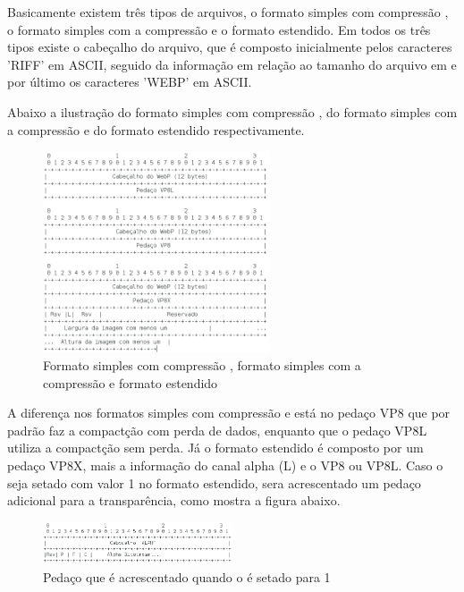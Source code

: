 \documentclass[espaco=simples,appendix=Name]{abnt}
\begin{document}
\begin{description}
Basicamente existem três tipos de arquivos, o formato simples com compressão , o formato simples com a compressão  e o formato estendido. Em todos os três tipos existe o cabeçalho do arquivo, que é composto inicialmente pelos caracteres 'RIFF' em ASCII, seguido da informação em relação ao tamanho do arquivo em  e por último os caracteres 'WEBP' em ASCII.

\newpage

Abaixo a ilustração do formato simples com compressão , do formato simples com a compressão  e do formato estendido respectivamente.

\begin{figure}[h]
  \centering
    \includegraphics[width=0.6\textwidth]{LossyLossLessExtended.png}
  \caption{Formato simples com compressão , formato simples com a compressão  e formato estendido}
\end{figure}

A diferença nos formatos simples com compressão  e  está no pedaço VP8 que por padrão faz a compactção com perda de dados, enquanto que o pedaço VP8L utiliza a compactção sem perda. Já o formato estendido é composto por um pedaço VP8X, mais a informação do canal alpha (L) e o  VP8 ou VP8L. Caso o  seja setado com valor 1 no formato estendido, sera acrescentado um pedaço adicional para a transparência, como mostra a figura abaixo.

\begin{figure}[h]
  \centering
    \includegraphics[width=0.5\textwidth]{AlphaChunk.png}
  \caption{Pedaço que é acrescentado quando o  é setado para 1}
\end{figure}


\end{description}
\end{document}
